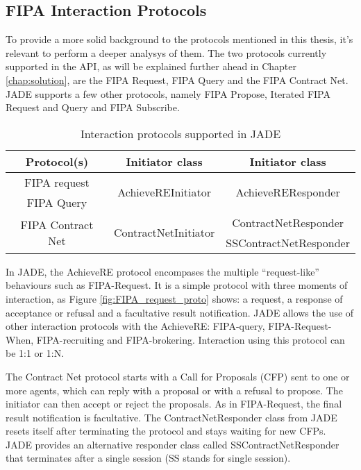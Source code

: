 \subsection{FIPA Interaction Protocols}

To provide a more solid background to the protocols mentioned in this thesis, it's relevant to perform a deeper analysys of them. The two protocols currently supported in the API, as will be explained further ahead in Chapter \ref{chap:solution}, are the FIPA Request, FIPA Query and the FIPA Contract Net. JADE supports a few other protocols, namely FIPA Propose, Iterated FIPA Request and Query and FIPA Subscribe.

\begin{table}
	\normalsize
	\caption{Interaction protocols supported in JADE}
	\label{tab:fipa_protos}
	\begin{center}
		\begin{tabular}{c|c|c}
		\hline
		\textbf{Protocol(s)} & \textbf{Initiator class} & \textbf{Initiator class} \\
		\hline
		FIPA request 	& \multirow{2}{*}{AchieveREInitiator} & \multirow{2}{*}{AchieveREResponder}\\
		FIPA Query 		& \\
		\hline
		\multirow{2}{*}{FIPA Contract Net} & \multirow{2}{*}{ContractNetInitiator} & ContractNetResponder \\
		 &  & SSContractNetResponder \\
		\hline
		\end{tabular}
	\end{center}
\end{table}


In JADE, the AchieveRE protocol encompases the multiple ``request-like'' behaviours such as FIPA-Request. It is a simple protocol with three moments of interaction, as Figure \ref{fig:FIPA_request_proto} shows: a request, a response of acceptance or refusal and a facultative result notification. JADE allows the use of other interaction protocols with the AchieveRE: FIPA-query, FIPA-Request-When, FIPA-recruiting and FIPA-brokering. Interaction using this protocol can be 1:1 or 1:N.

The Contract Net protocol starts with a Call for Proposals (CFP) sent to one or more agents, which can reply with a proposal or with a refusal to propose. The initiator can then accept or reject the proposals. As in FIPA-Request, the final result notification is facultative. The ContractNetResponder class from JADE resets itself after terminating the protocol and stays waiting for new CFPs. JADE provides an alternative responder class called SSContractNetResponder that terminates after a single session (SS stands for single session).

